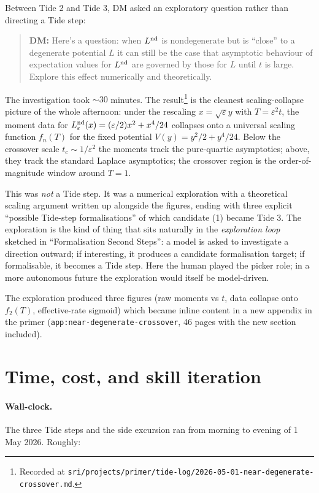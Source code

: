 \documentclass[11pt]{article}
\newcommand{\userbox}[1]{\par\medskip\begin{quote}\small\textbf{\textcolor{blue!60}{DM:}} #1\end{quote}\medskip}
\begin{document}
Between Tide 2 and Tide 3, DM asked an exploratory question rather
than directing a Tide step:

\userbox{Here's a question: when $L^{\rm nd}$ is nondegenerate but is
``close'' to a degenerate potential $L$ it can still be the case that
asymptotic behaviour of expectation values for $L^{\rm nd}$ are
governed by those for $L$ until $t$ is large. Explore this effect
numerically and theoretically.}

The investigation took $\sim 30$ minutes. The
result\footnote{Recorded at
\texttt{sri/projects/primer/tide-log/2026-05-01-near-degenerate-crossover.md}.}
is the cleanest scaling-collapse picture of the whole afternoon:
under the rescaling $x = \sqrt{\varepsilon} y$ with $T = \varepsilon^2
t$, the moment data for $L^{\rm nd}_\varepsilon(x) =
(\varepsilon/2) x^2 + x^4/24$ collapses onto a universal scaling
function $f_n(T)$ for the fixed potential $V(y) = y^2/2 + y^4/24$.
Below the crossover scale $t_c \sim 1/\varepsilon^2$ the moments
track the pure-quartic asymptotics; above, they track the standard
Laplace asymptotics; the crossover region is the order-of-magnitude
window around $T = 1$.

This was \emph{not} a Tide step. It was a numerical exploration with a
theoretical scaling argument written up alongside the figures, ending
with three explicit ``possible Tide-step formalisations'' of which
candidate (1) became Tide 3. The exploration is the kind of thing that
sits naturally in the \emph{exploration loop} sketched in
``Formalisation Second Steps'': a model is asked to investigate a
direction outward; if interesting, it produces a candidate
formalisation target; if formalisable, it becomes a Tide step. Here
the human played the picker role; in a more autonomous future the
exploration would itself be model-driven.

The exploration produced three figures (raw moments vs $t$, data
collapse onto $f_2(T)$, effective-rate sigmoid) which became inline
content in a new appendix in the primer
(\texttt{app:near-degenerate-crossover}, 46 pages with the new section
included).

\section{Time, cost, and skill iteration}

\paragraph{Wall-clock.} The three Tide steps and the side excursion
ran from morning to evening of 1 May 2026. Roughly:
\end{document}
